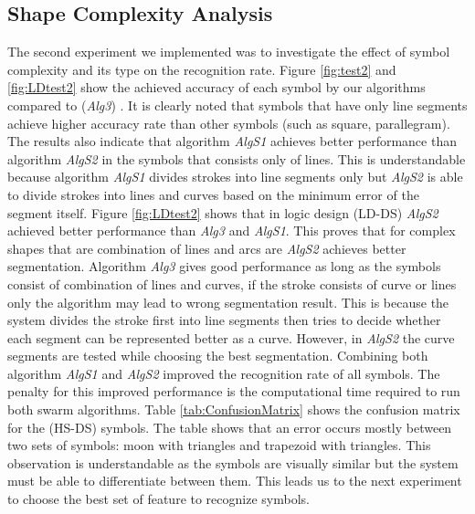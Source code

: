 \documentclass[preprint,10pt,5p,twocolumn]{elsarticle}
\begin{document}
\subsection{Shape Complexity Analysis}
\label{sec:ShapeComplexityExperiments}
The second experiment we implemented was to investigate the effect of symbol complexity and its type on the recognition rate. Figure \ref{fig:test2} and \ref{fig:LDtest2} show the achieved accuracy of each symbol by our algorithms compared to (\textsl{Alg3}) \cite{earlyprocess}. It is clearly noted that symbols that have only line segments achieve higher accuracy rate than other symbols (such as square, parallegram). The results also indicate that algorithm \textsl{AlgS1} achieves better performance than algorithm \textsl{AlgS2} in the symbols that consists only of lines. This is understandable because algorithm \textsl{AlgS1} divides strokes into line segments only but \textsl{AlgS2} is able to divide strokes into lines and curves based on the minimum error of the segment itself. Figure \ref{fig:LDtest2} shows that in logic design (LD-DS) \textsl{AlgS2} achieved better performance than \textsl{Alg3} and  \textsl{AlgS1}.  This proves that for complex shapes that are combination of lines and arcs are \textsl{AlgS2} achieves better segmentation. Algorithm \textsl{Alg3} gives good performance as long as the symbols consist of combination of lines and curves, if the stroke consists of curve or lines only the algorithm may lead to wrong segmentation result. This is because the system divides the stroke first into line segments then tries to decide whether each segment can be represented better as a curve. However, in \textsl{AlgS2} the curve segments are tested while choosing the best segmentation. Combining both algorithm \textsl{AlgS1} and \textsl{AlgS2} improved the recognition rate of all symbols. The penalty for this improved performance is the computational time required to run both swarm algorithms. Table \ref{tab:ConfusionMatrix} shows the confusion matrix for the (HS-DS) symbols. The table shows that an error occurs mostly between two sets of symbols: moon with triangles and trapezoid with triangles. This observation is understandable as the symbols are visually similar but the system must be able to differentiate between them. This leads us to the next experiment to choose the best set of feature to recognize symbols. 
\end{document}
